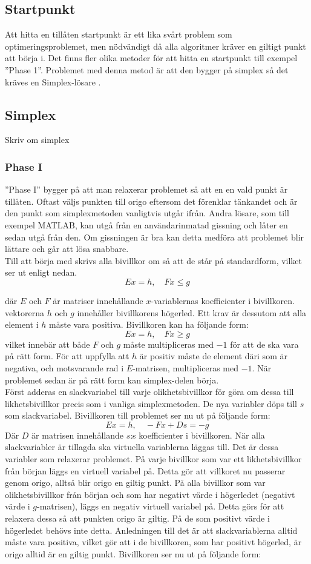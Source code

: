 \subsection{Startpunkt}
Att hitta en tillåten startpunkt är ett lika svårt problem som optimeringsproblemet, men nödvändigt då alla algoritmer kräver en giltigt punkt att börja i. Det finns fler olika metoder för att hitta en startpunkt till exempel ''Phase 1''. Problemet med denna metod är att den bygger på simplex så det kräves en Simplex-lösare \citep{numericaloptimization}.

\subsection{Simplex}
Skriv om simplex

\subsubsection{Phase I}
''Phase I'' bygger på att man relaxerar problemet så att en en vald punkt är tillåten. Oftast väljs punkten till origo eftersom det förenklar tänkandet och är den punkt som simplexmetoden vanligtvis utgår ifrån. Andra lösare, som till exempel MATLAB, kan utgå från en användarinmatad gissning och låter en sedan utgå från den\citep{quadprog}. Om gissningen är bra kan detta medföra att problemet blir lättare och går att lösa snabbare. \\
Till att börja med skrivs alla bivillkor om så att de står på standardform, vilket ser ut enligt nedan.
$$Ex = h, \quad Fx \leq g$$
\raggedright där $E$ och $F$ är matriser innehållande $x$-variablernas koefficienter i bivillkoren. vektorerna $h$ och $g$ innehåller bivillkorens högerled. Ett krav är dessutom att alla element i $h$ måste vara positiva.
Bivillkoren kan ha följande form:
$$Ex = h, \quad Fx \geq g$$
vilket innebär att både $F$ och $g$ måste multipliceras med $-1$ för att de ska vara på rätt form. För att uppfylla att $h$ är positiv måste de element däri som är negativa, och motsvarande rad i $E$-matrisen, multipliceras med $-1$.
När problemet sedan är på rätt form kan simplex-delen börja. \\
Först adderas en slackvariabel till varje olikhetsbivillkor för göra om dessa till likhetsbivillkor precis som i vanliga simplexmetoden. De nya variabler döps till $s$ som slackvariabel. Bivillkoren till problemet ser nu ut på följande form:
$$Ex = h, \quad -Fx+Ds = -g$$
Där $D$ är matrisen innehållande $s$:s koefficienter i bivillkoren.
När alla slackvariabler är tillagda ska virtuella variablerna läggas till. Det är dessa variabler som relaxerar problemet. På varje bivillkor som var ett likhetsbivillkor från början läggs en virtuell variabel på. Detta gör att villkoret nu passerar genom origo, alltså blir origo en giltig punkt. På alla bivillkor som var olikhetsbivillkor från början och som har negativt värde i högerledet (negativt värde i $g$-matrisen), läggs en negativ virtuell variabel på. Detta görs för att relaxera dessa så att punkten origo är giltig. På de som positivt värde i högerledet behövs inte detta. Anledningen till det är att slackvariablerna alltid måste vara positiva, vilket gör att i de bivillkoren, som har positivt högerled, är origo alltid är en giltig punkt. Bivillkoren ser nu ut på följande form:

